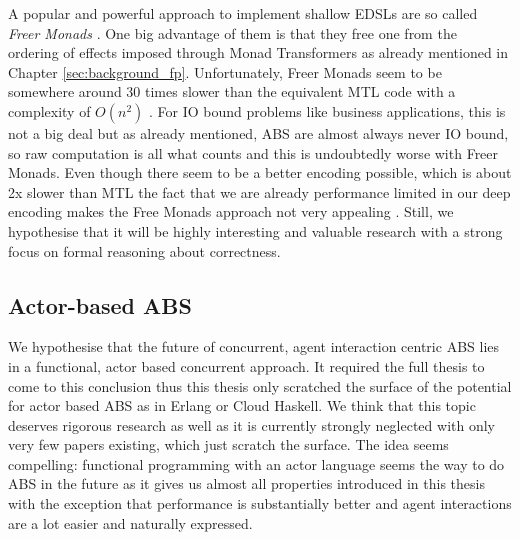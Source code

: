 \medskip

A popular and powerful approach to implement shallow EDSLs are so called \textit{Freer Monads} \cite{rivas_notions_2014}. One big advantage of them is that they free one from the ordering of effects imposed through Monad Transformers as already mentioned in Chapter \ref{sec:background_fp}. Unfortunately, Freer Monads seem to be somewhere around 30 times slower than the equivalent MTL code with a complexity of $O(n^2)$ \cite{maguire_freermonads_better}. For IO bound problems like business applications, this is not a big deal but as already mentioned, ABS are almost always never IO bound, so raw computation is all what counts and this is undoubtedly worse with Freer Monads. Even though there seem to be a better encoding possible, which is about 2x slower than MTL \cite{maguire_freermonads_fast} the fact that we are already performance limited in our deep encoding makes the Free Monads approach not very appealing \cite{maguire_higherorder_effects}. Still, we hypothesise that it will be highly interesting and valuable research with a strong focus on formal reasoning about correctness.



\subsection{Actor-based ABS}
We hypothesise that the future of concurrent, agent interaction centric ABS lies in a functional, actor based concurrent approach. It required the full thesis to come to this conclusion thus this thesis only scratched the surface of the potential for actor based ABS as in Erlang or Cloud Haskell. We think that this topic deserves rigorous research as well as it is currently strongly neglected with only very few papers existing, which just scratch the surface. The idea seems compelling: functional programming with an actor language seems the way to do ABS in the future as it gives us almost all properties introduced in this thesis with the exception that performance is substantially better and agent interactions are a lot easier and naturally expressed.

